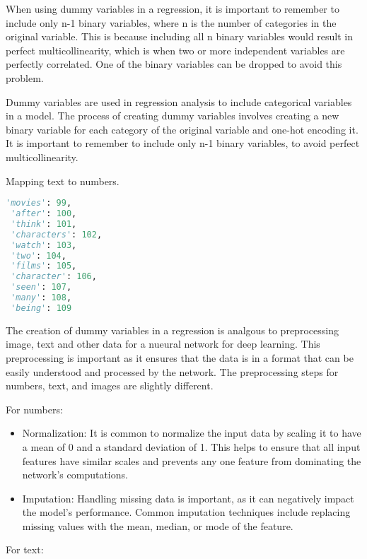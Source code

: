 When using dummy variables in a regression, it is important to remember to include only n-1 binary variables, where n is the number of categories in the original variable. This is because including all n binary variables would result in perfect multicollinearity, which is when two or more independent variables are perfectly correlated. One of the binary variables can be dropped to avoid this problem.

Dummy variables are used in regression analysis to include categorical variables in a model. The process of creating dummy variables involves creating a new binary variable for each category of the original variable and one-hot encoding it. It is important to remember to include only n-1 binary variables, to avoid perfect multicollinearity.



\begin{marginlisting}[-0.5cm]
\caption{Mapping text to numbers.}
\vspace{0.2cm}
\begin{lstlisting}[language=Python,style=kaolstplain]
 'movies': 99,
 'after': 100,
 'think': 101,
 'characters': 102,
 'watch': 103,
 'two': 104,
 'films': 105,
 'character': 106,
 'seen': 107,
 'many': 108,
 'being': 109
\end{lstlisting}
\end{marginlisting}


The creation of dummy variables in a regression is analgous to preprocessing image, text and other data for a nueural network for deep learning. This preprocessing is important  as it ensures that the data is in a format that can be easily understood and processed by the network. The preprocessing steps for numbers, text, and images are slightly different.

For numbers:
\begin{itemize}
	\item Normalization: It is common to normalize the input data by scaling it to have a mean of 0 and a standard deviation of 1. This helps to ensure that all input features have similar scales and prevents any one feature from dominating the network's computations.
	\item Imputation: Handling missing data is important, as it can negatively impact the model's performance. Common imputation techniques include replacing missing values with the mean, median, or mode of the feature.
\end{itemize}

For text:

